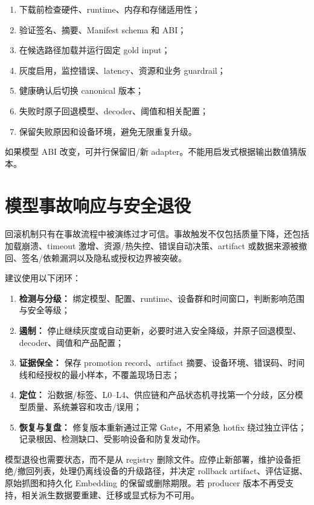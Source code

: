 \begin{enumerate}
  \item 下载前检查硬件、runtime、内存和存储适用性；
  \item 验证签名、摘要、Manifest schema 和 ABI；
  \item 在候选路径加载并运行固定 gold input；
  \item 灰度启用，监控错误、latency、资源和业务 guardrail；
  \item 健康确认后切换 canonical 版本；
  \item 失败时原子回退模型、decoder、阈值和相关配置；
  \item 保留失败原因和设备环境，避免无限重复升级。
\end{enumerate}

如果模型 ABI 改变，可并行保留旧/新 adapter。不能用启发式根据输出数值猜版本。

\section{模型事故响应与安全退役}

回滚机制只有在事故流程中被演练过才可信。事故触发不仅包括质量下降，还包括加载崩溃、timeout 激增、资源/热失控、错误自动决策、artifact 或数据来源被撤回、签名/依赖漏洞以及隐私或授权边界被突破。

建议使用以下闭环：

\begin{enumerate}
  \item \textbf{检测与分级：} 绑定模型、配置、runtime、设备群和时间窗口，判断影响范围与安全等级；
  \item \textbf{遏制：} 停止继续灰度或自动更新，必要时进入安全降级，并原子回退模型、decoder、阈值和产品配置；
  \item \textbf{证据保全：} 保存 promotion record、artifact 摘要、设备环境、错误码、时间线和经授权的最小样本，不覆盖现场日志；
  \item \textbf{定位：} 沿数据/标签、L0--L4、供应链和产品状态机寻找第一个分歧，区分模型质量、系统兼容和攻击/误用；
  \item \textbf{恢复与复盘：} 修复版本重新通过正常 Gate，不用紧急 hotfix 绕过独立评估；记录根因、检测缺口、受影响设备和防复发动作。
\end{enumerate}

模型退役也需要状态，而不是从 registry 删除文件。应停止新部署，维护设备拒绝/撤回列表，处理仍离线设备的升级路径，并决定 rollback artifact、评估证据、原始抓图和持久化 Embedding 的保留或删除期限。若 producer 版本不再受支持，相关派生数据要重建、迁移或显式标为不可用。

